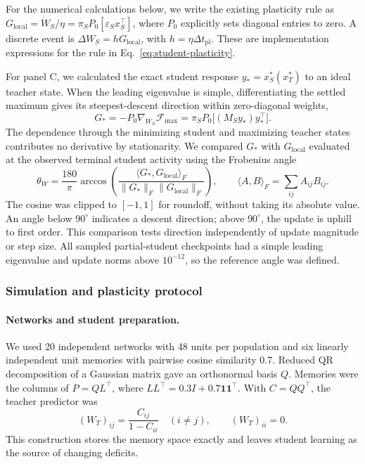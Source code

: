 \documentclass[10pt,letterpaper]{article}
\theoremstyle{plain}
\theoremstyle{remark}
\begin{document}
For the numerical calculations below, we write the existing plasticity rule as \(G_{\mathrm{local}}=\dot W_S/\eta=\pi_SP_0[\varepsilon_Sx_S^\top]\), where \(P_0\) explicitly sets diagonal entries to zero. A discrete event is \(\Delta W_S=hG_{\mathrm{local}}\), with \(h=\eta\Delta t_{\mathrm{pl}}\). These are implementation expressions for the rule in Eq.~\eqref{eq:student-plasticity}.

For panel C, we calculated the exact student response \(y_*=x_S^*(x_T^*)\) to an ideal teacher state. When the leading eigenvalue is simple, differentiating the settled maximum gives its steepest-descent direction within zero-diagonal weights,
\begin{equation}
G_*=-P_0\nabla_{W_S}\mathcal F_{\max}
=\pi_SP_0\bigl[(M_Sy_*)y_*^\top\bigr].
\label{eq:methods-settled-weight-gradient}
\end{equation}
The dependence through the minimizing student and maximizing teacher states contributes no derivative by stationarity. We compared \(G_*\) with \(G_{\mathrm{local}}\) evaluated at the observed terminal student activity using the Frobenius angle
\begin{equation}
\theta_W=\frac{180}{\pi}\arccos\!\left(
\frac{\langle G_*,G_{\mathrm{local}}\rangle_F}
{\|G_*\|_F\|G_{\mathrm{local}}\|_F}\right),\qquad
\langle A,B\rangle_F=\sum_{ij}A_{ij}B_{ij}.
\label{eq:methods-update-angle}
\end{equation}
The cosine was clipped to \([-1,1]\) for roundoff, without taking its absolute value. An angle below \(90^\circ\) indicates a descent direction; above \(90^\circ\), the update is uphill to first order. This comparison tests direction independently of update magnitude or step size. All sampled partial-student checkpoints had a simple leading eigenvalue and update norms above \(10^{-12}\), so the reference angle was defined.

\subsubsection{Simulation and plasticity protocol}
\label{sec:methods-redistribution-protocol}

\paragraph{Networks and student preparation.}
We used 20 independent networks with 48 units per population and six linearly independent unit memories with pairwise cosine similarity 0.7. Reduced QR decomposition of a Gaussian matrix gave an orthonormal basis \(Q\). Memories were the columns of \(P=QL^\top\), where \(LL^\top=0.3I+0.7\mathbf 1\mathbf 1^\top\). With \(C=QQ^\top\), the teacher predictor was
\begin{equation}
(W_T)_{ij}=\frac{C_{ij}}{1-C_{ii}}\quad(i\ne j),\qquad (W_T)_{ii}=0.
\label{eq:methods-settled-weight-construction}
\end{equation}
This construction stores the memory space exactly and leaves student learning as the source of changing deficits.
\end{document}
